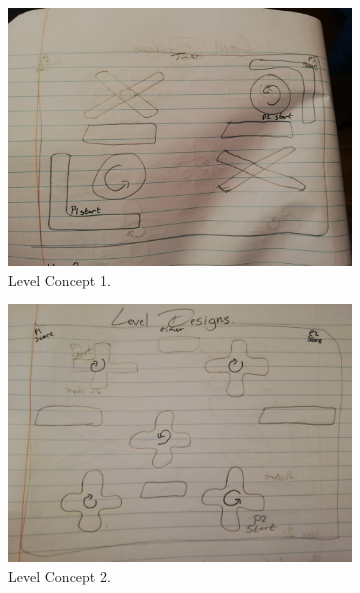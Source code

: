 \begin{figure}
\centering
\begin{subfigure}{.5\textwidth}
\centering
  \includegraphics[width= 1\linewidth]{Images/Leveldesign1.jpg}
  \caption{Level Concept 1.}
  \label{fig:Level1 Concept}
\end{subfigure}%
\begin{subfigure}{.5\textwidth}
\centering
  \includegraphics[width= 1\linewidth]{Images/Leveldesign2.jpg}
  \caption{Level Concept 2.}
  \label{fig:Level2 Concept}
  \end{subfigure}%
  \newline
\begin{subfigure}{.5\textwidth}
\centering

\end{subfigure}
\end{figure}
